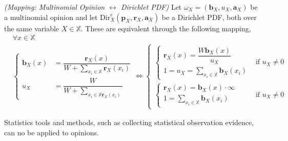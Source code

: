 \begin{definition}
    \emph{(Mapping: Multinomial Opinion $\leftrightarrow$ Dirichlet PDF)} Let $\omega_X = (\mathbf{b}_X, u_X, \mathbf{a}_X)$ be a multinomial opinion and let $\mathrm{Dir}^\mathrm{e}_X(\mathbf{p}_X, \mathbf{r}_X, \mathbf{a}_X)$ be a Dirichlet PDF, both over the same variable $X \in \mathbb{X}$. These are equivalent through the following mapping,
    \begin{equation}
        \begin{split}
            & \forall x \in \mathbb{X} \\
            & \begin{cases}
                \mathbf{b}_X(x) & = \dfrac{\mathbf{r}_X(x)}{W + \sum\limits_{x_i \in \mathbb{X}} \mathbf{r}_X(x_i)} \\
                u_X & = \dfrac{W}{W + \sum\limits_{x_i \in \mathbb{X} \mathbf{r}_X(x_i)}}
            \end{cases} \Leftrightarrow
            \begin{cases}
                \begin{cases}
                    \mathbf{r}_X(x) = \dfrac{W \mathbf{b}_X(x)}{u_X} \\
                    1 = u_X = \sum\limits_{x_i \in \mathbb{X}} \mathbf{b}_X(x_i)
                \end{cases} & \text{if } u_X \neq 0 \\
                \begin{cases}
                    \mathbf{r}_X(x) = \mathbf{b}_X(x) \cdot \infty \\
                    1 = \sum\limits_{x_i \in \mathbb{X}} \mathbf{b}_X(x_i)
                \end{cases} & \text{if } u_X \neq 0
            \end{cases}
        \end{split}
    \end{equation}
\end{definition}

Statistics tools and methods, such as collecting statistical observation evidence, can no be applied to opinions.
